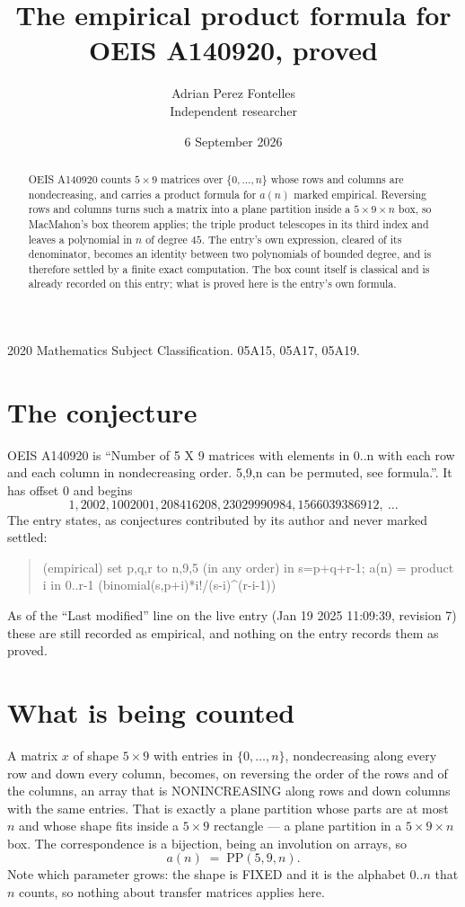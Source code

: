 \documentclass[11pt,a4paper]{article}
\title{The empirical product formula for OEIS A140920, proved}
\author{Adrian Perez Fontelles\\ \small Independent researcher}
\date{6 September 2026}
\theoremstyle{plain}
\theoremstyle{definition}
\begin{document}
\maketitle

\begin{abstract}
OEIS A140920 counts $5\times9$ matrices over $\{0,\dots,n\}$ whose rows and columns are
nondecreasing, and carries a product formula for $a(n)$ marked empirical. Reversing rows and
columns turns such a matrix into a plane partition inside a $5\times9\times n$ box, so
MacMahon's box theorem applies; the triple product telescopes in its third index and leaves a
polynomial in $n$ of degree $45$. The entry's own expression, cleared of its denominator,
becomes an identity between two polynomials of bounded degree, and is therefore settled by a
finite exact computation. The box count itself is classical and is already recorded on this
entry; what is proved here is the entry's own formula.
\end{abstract}

\noindent\small 2020 Mathematics Subject Classification. 05A15, 05A17, 05A19.\normalsize

\section{The conjecture}

OEIS A140920 is ``Number of 5 X 9 matrices with elements in 0..n with each row and each column in nondecreasing order. 5,9,n can be permuted, see formula.''. It has offset $0$ and begins
\[
1, 2002, 1002001, 208416208, 23029990984, 1566039386912,\ \dots
\]
The entry states, as conjectures contributed by its author and never marked settled:
\begin{quote}
(empirical) set p,q,r to n,9,5 (in any order) in s=p+q+r-1; a(n) = product {i in 0..r-1} (binomial(s,p+i)*i!/(s-i)\^{}(r-i-1))

\end{quote}
As of the ``Last modified'' line on the live entry (Jan 19 2025 11:09:39, revision 7) these are still
recorded as empirical, and nothing on the entry records them as proved.

\section{What is being counted}

A matrix $x$ of shape $5\times9$ with entries in $\{0,\dots,n\}$, nondecreasing along
every row and down every column, becomes, on reversing the order of the rows and of the
columns, an array that is NONINCREASING along rows and down columns with the same entries. That
is exactly a plane partition whose parts are at most $n$ and whose shape fits inside a
$5\times9$ rectangle --- a plane partition in a $5\times9\times n$ box. The
correspondence is a bijection, being an involution on arrays, so
\[
a(n)\;=\;\mathrm{PP}(5,9,n).
\]
Note which parameter grows: the shape is FIXED and it is the alphabet $0..n$ that $n$ counts,
so nothing about transfer matrices applies here.
\end{document}
